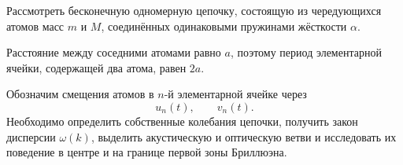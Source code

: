 \documentclass[../final.tex]{subfiles}
\begin{document}





\condition

Рассмотреть бесконечную одномерную цепочку,
состоящую из чередующихся атомов масс $m$ и $M$,
соединённых одинаковыми пружинами жёсткости $\alpha$.

Расстояние между соседними атомами равно $a$,
поэтому период элементарной ячейки, содержащей два атома,
равен $2a$.

Обозначим смещения атомов в $n$-й элементарной ячейке через
%
\begin{equation*}
    u_n(t),
    \qquad
    v_n(t).
\end{equation*}
%
Необходимо определить собственные колебания цепочки,
получить закон дисперсии $\omega(k)$,
выделить акустическую и оптическую ветви
и исследовать их поведение в центре и на границе
первой зоны Бриллюэна.


\end{document}
